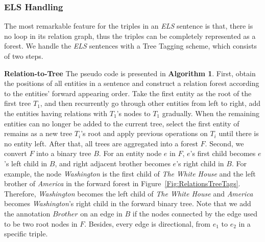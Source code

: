 \documentclass[conference]{IEEEtran}
\begin{document}
\subsubsection{ELS Handling}
\label{sssect:ELS}
The most remarkable feature for the triples in an \emph{ELS} sentence is that, there is no loop in its relation graph, thus the triples can be completely represented as a forest. We handle the \emph{ELS} sentences with a Tree Tagging scheme, which consists of two steps.

\textbf{Relation-to-Tree} The pseudo code is presented in \textbf{Algorithm 1}. First, obtain the positions of all entities in a sentence and construct a relation forest according to the entities' forward appearing order. Take the first entity as the root of the first tree $T_1$, and then recurrently go through other entities 
from left to right, add the entities having relations with $T_1$'s nodes to $T_1$ gradually. When the remaining entities can no longer be added to the current tree, select the first entity of remains as a new tree $T_i$'s root and apply previous operations on $T_i$ until there is no entity left. After that, all trees are aggregated into a forest $F$. Second, we convert $F$ into a binary tree $B$. For an entity node $e$ in $F$, $e$'s first child becomes $e$'s left child in $B$, and right adjacent brother becomes $e$'s right child in $B$. For example, the node \emph{Washington} is the first child of \emph{The White House} and the left brother of \emph{America} in the forward forest in Figure~\ref{Fig:RelationsTreeTags}. Therefore, \emph{Washington} becomes the left child of \emph{The White House} and \emph{America} becomes \emph{Washington}'s right child in the forward binary tree. Note that we add the annotation $Brother$ on an edge in $B$ if the nodes connected by the edge used to be two root nodes in $F$. Besides, every edge is directional, from $e_1$ to $e_2$ in a specific triple.
\end{document}
